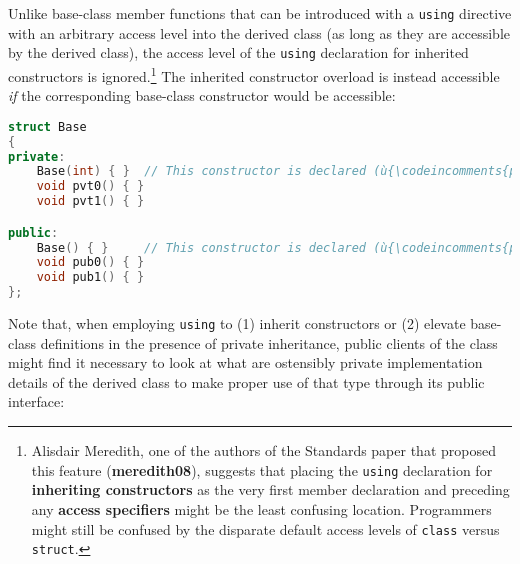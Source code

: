 Unlike base-class member functions that can be introduced with a
\texttt{using} directive with an arbitrary access level into the derived
class (as long as they are accessible by the derived class), the access
level of the \texttt{using} declaration for inherited constructors is
ignored.{\cprotect\footnote{Alisdair Meredith, one of the authors of the
Standards paper that proposed this feature (\textbf{meredith08}), suggests that
placing the \texttt{using} declaration for \textbf{inheriting
constructors} as the very first member declaration and preceding any
\textbf{access specifiers} might be the least confusing location. Programmers might still be confused by
the disparate default access levels of \texttt{class} versus
  \texttt{struct}.}} The inherited constructor overload is instead
accessible \emph{if} the corresponding base-class constructor would be
accessible:

\begin{lstlisting}[language=C++]
struct Base
{
private:
    Base(int) { }  // This constructor is declared (ù{\codeincomments{private}}ù) in the base class.
    void pvt0() { }
    void pvt1() { }

public:
    Base() { }     // This constructor is declared (ù{\codeincomments{public}}ù) in the base class.
    void pub0() { }
    void pub1() { }
};
\end{lstlisting}

\noindent Note that, when employing \texttt{using} to (1) inherit constructors or
(2) elevate base-class definitions in the presence of private
inheritance, public clients of the class might find it necessary
to look at what are ostensibly private implementation details of the
derived class to make proper use of that type through its
public interface:

